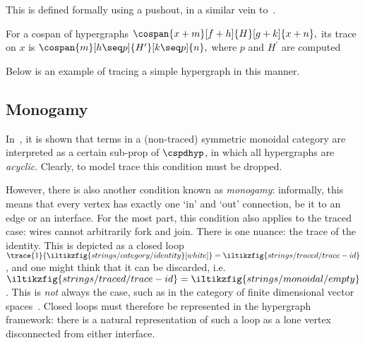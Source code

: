 This is defined formally using a pushout, in a similar vein
to~\cite{dixon2013opengraphs}.

\begin{definition}
    For a cospan of hypergraphs \(
        \cospan{x+m}[f+h]{H}[g+k]{x+n},
    \) its trace on \(x\) is \(
        \cospan{m}[h \seq p]{H^\prime}[k \seq p]{n},
    \) where \(p\) and \(H^\prime\) are computed%
    \iftoggle{conf}{
        as the pushout of \(f + h\) and \([\id, \id]\).
    }{
        by the following pushout:
        \begin{center}
            \tikzfig{graphs/trace/trace-pushout}
        \end{center}
    }
\end{definition}

\begin{example}
    Below is an example of tracing a simple hypergraph in this manner.
    \begin{center}
    \end{center}
\end{example}

\subsection{Monogamy}

In~\cite{bonchi2016rewriting}, it is shown that terms in a (non-traced)
symmetric monoidal category are interpreted as a certain sub-prop of
\(\cspdhyp\), in which all hypergraphs are \emph{acyclic}.
Clearly, to model trace this condition must be dropped.

However, there is also another condition known as \emph{monogamy}: informally,
this means that every vertex has exactly one `in' and `out' connection, be it to
an edge or an interface.
For the most part, this condition also applies to the traced case: wires cannot
arbitrarily fork and join.
There is one nuance: the trace of the identity.
This is depicted as a closed loop \(
    \trace{1}{\iltikzfig{strings/category/identity}[white]}
    =
    \iltikzfig{strings/traced/trace-id}
\), and one might think that it can be discarded, i.e. \(
    \iltikzfig{strings/traced/trace-id}
    =
    \iltikzfig{strings/monoidal/empty}
\).
This is \emph{not} always the case, such as in the category of finite
dimensional vector spaces~\cite[Sec. 6.1]{hasegawa1997recursion}.
Closed loops must therefore be represented in the hypergraph framework:
there is a natural representation of such a loop as a lone vertex disconnected
from either interface.

